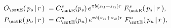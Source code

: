 \begin{equation}\begin{aligned}
O_{\rm\sst E}(\,p_s\,|\,r\,)\;=\;& C_{\rm\sst E}^s(p_s)
\,e^{\pi b(s_\1+s_\2)r}\;
F_{\rm\sst E}^s(\,p_s\,|\,r\,),\\
P_{\rm\sst E}(\,p_u\,|\,r\,)\;=\;& C_{\rm\sst E}^u(p_u)
\,e^{\pi b(s_\1+s_\2)r}\;
F_{\rm\sst E}^u(\,p_u\,|\,r\,),
\end{aligned}\end{equation}

